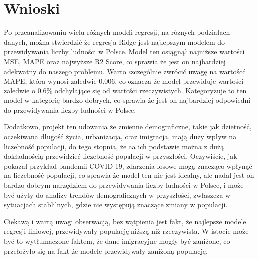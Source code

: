 \documentclass[11pt]{article}
\begin{document}
\section{Wnioski}
Po przeanalizowaniu wielu różnych modeli regresji, na róznych podziałach danych, można stwierdzić że regresja Ridge jest najlepszym modelem do przewidywania liczby ludności w Polsce.
Model ten osiągnął najniższe wartości MSE, MAPE oraz najwyższe R2 Score, co sprawia że jest on najbardziej adekwatny do naszego problemu.
Warto szczególnie zwrócić uwagę na wartoścć MAPE, która wynosi zaledwie 0.006, co oznacza że model przewiduje wartości zaledwie o 0.6\% odchylające się od wartości rzeczywistych.
Kategoryzuje to ten model w kategorię bardzo dobrych\cite{rg}, co sprawia że jest on najbardziej odpowiedni do przewidywania liczby ludności w Polsce.\par
Dodatkowo, projekt ten udowania że zmienne demograficzne, takie jak dzietność, oczekiwana długość życia, urbanizacja, oraz imigracja, mają duży wpływ na liczebność populacji,
do tego stopnia, że na ich podstawie można z dużą dokładnością przewidzieć liczebność populacji w przyszłości.
Oczywiście, jak pokazał przykład pandemii COVID-19, zdarzenia losowe mogą znacząco wpłynąć na liczebność populacji, co sprawia że model ten nie jest idealny, ale nadal jest on bardzo dobrym narzędziem do przewidywania liczby ludności w Polsce,
i może być użyty do analizy trendów demograficznych w przyszłości, zwłaszcza w sytuacjach stablilnych, gdzie nie występują znaczące zmiany w populacji.\par
Ciekawą i wartą uwagi obserwacją, bez wątpienia jest fakt, że najlepsze modele regresji liniowej, przewidywały populację niższą niż rzeczywista.
W istocie może być to wytłumaczone faktem, że dane imigracyjne mogły być zaniżone, co przełożyło się na fakt że modele przewidywały zaniżoną populację.


\end{document}
